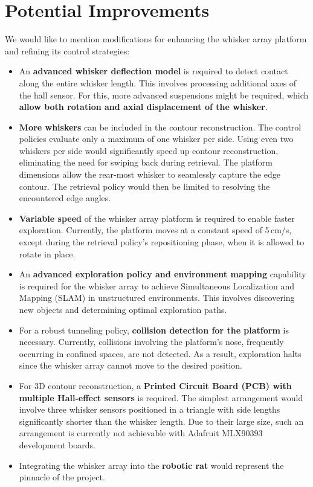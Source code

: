 \section{Potential Improvements}
We would like to mention modifications for enhancing the whisker array platform and refining its control strategies:
\begin{itemize}
    \item An \textbf{advanced whisker deflection model} is required to detect contact along the entire whisker length.
    This involves processing additional axes of the hall sensor.
    For this, more advanced suspensions might be required, which \textbf{allow both rotation and axial displacement of the whisker}.

    \item \textbf{More whiskers} can be included in the contour reconstruction.
    The control policies evaluate only a maximum of one whisker per side.
    Using even two whiskers per side would significantly speed up contour reconstruction, eliminating the need for swiping back during retrieval.
    The platform dimensions allow the rear-most whisker to seamlessly capture the edge contour.
    The retrieval policy would then be limited to resolving the encountered edge angles.

    \item \textbf{Variable speed} of the whisker array platform is required to enable faster exploration.
    Currently, the platform moves at a constant speed of 5\,cm/s, except during the retrieval policy's repositioning phase, when it is allowed to rotate in place.

    \item An \textbf{advanced exploration policy and environment mapping} capability is required for the whisker array to achieve Simultaneous Localization and Mapping (SLAM) in unstructured environments.
    This involves discovering new objects and determining optimal exploration paths.

    \item For a robust tunneling policy, \textbf{collision detection for the platform} is necessary.
    Currently, collisions involving the platform's nose, frequently occurring in confined spaces, are not detected.
    As a result, exploration halts since the whisker array cannot move to the desired position.

    \item For 3D contour reconstruction, a \textbf{Printed Circuit Board (PCB) with multiple Hall-effect sensors} is required.
    The simplest arrangement would involve three whisker sensors positioned in a triangle with side lengths significantly shorter than the whisker length.
    Due to their large size, such an arrangement is currently not achievable with Adafruit MLX90393 development boards.

    \item Integrating the whisker array into the \textbf{robotic rat} would represent the pinnacle of the project.
\end{itemize}
